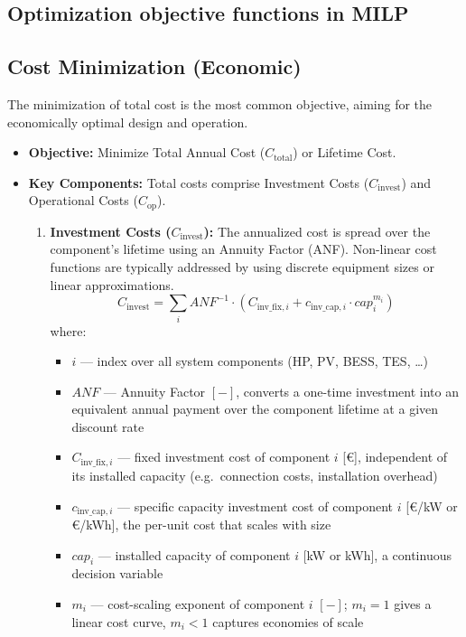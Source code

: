 \documentclass[11pt,a4paper]{report}
\begin{document}
\subsection{Optimization objective functions in MILP}

\subsection*{Cost Minimization (Economic)}

The minimization of total cost is the most common objective, aiming for the economically optimal design and operation.

\begin{itemize}
    \item \textbf{Objective:} Minimize Total Annual Cost ($C_{\text{total}}$) or Lifetime Cost.
    \item \textbf{Key Components:} Total costs comprise Investment Costs ($C_{\text{invest}}$) and Operational Costs ($C_{\text{op}}$).
    \begin{enumerate}
        \item \textbf{Investment Costs ($C_{\text{invest}}$):} The annualized cost is spread over the component's lifetime using an Annuity Factor (ANF). Non-linear cost functions are typically addressed by using discrete equipment sizes or linear approximations.
        $$C_{\text{invest}} = \sum_{i} ANF^{-1} \cdot (C_{\text{inv\_fix},i} + c_{\text{inv\_cap},i} \cdot cap_{i}^{m_{i}})$$
        \noindent where:
        \begin{itemize}
            \item $i$ --- index over all system components (HP, PV, BESS, TES, \ldots)
            \item $ANF$ --- Annuity Factor $[-]$, converts a one-time investment into an equivalent annual payment over the component lifetime at a given discount rate
            \item $C_{\text{inv\_fix},i}$ --- fixed investment cost of component $i$ [\euro], independent of its installed capacity (e.g.\ connection costs, installation overhead)
            \item $c_{\text{inv\_cap},i}$ --- specific capacity investment cost of component $i$ [\euro/kW or \euro/kWh], the per-unit cost that scales with size
            \item $cap_{i}$ --- installed capacity of component $i$ [kW or kWh], a continuous decision variable
            \item $m_{i}$ --- cost-scaling exponent of component $i$ $[-]$; $m_i = 1$ gives a linear cost curve, $m_i < 1$ captures economies of scale
        \end{itemize}


\end{enumerate}
\end{itemize}
\end{document}
